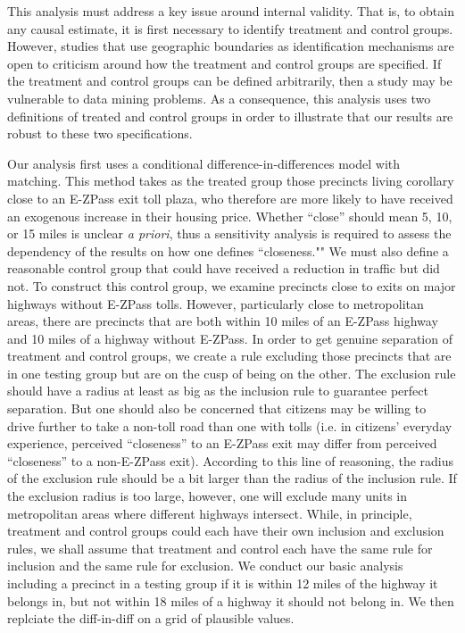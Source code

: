 This analysis must address a key issue around internal validity. That is, to obtain any causal estimate, it is first necessary to identify treatment and control groups. However, studies that use geographic boundaries as identification mechanisms are open to criticism around how the treatment and control groups are specified. If the treatment and control groups can be defined arbitrarily, then a study may be vulnerable to data mining problems. As a consequence, this analysis uses two definitions of treated and control groups in order to illustrate that our results are robust to these two specifications. 

Our analysis first uses a conditional difference-in-differences model with matching. This method takes as the treated group those precincts living corollary close to an E-ZPass exit toll plaza, who therefore are more likely to have received an exogenous increase in their housing price. Whether ``close'' should mean 5, 10, or 15 miles is unclear \emph{a priori}, thus a sensitivity analysis is required to assess the dependency of the results on how one defines ``closeness."" We must also define a reasonable control group that could have received a reduction in traffic but did not. To construct this control group, we examine precincts close to exits on major highways without E-ZPass tolls. However, particularly close to metropolitan areas, there are precincts that are both within 10 miles of an E-ZPass highway and 10 miles of a highway without E-ZPass.  In order to get genuine separation of treatment and control groups, we create a rule excluding those precincts that are in one testing group but are on the cusp of being on the other. The exclusion rule should have a radius at least as big as the inclusion rule to guarantee perfect separation. But one should also be concerned that citizens may be willing to drive further to take a non-toll road than one with tolls (i.e. in citizens' everyday experience, perceived ``closeness'' to an E-ZPass exit may differ from perceived ``closeness'' to a non-E-ZPass exit). According to this line of reasoning, the radius of the exclusion rule should be a bit larger than the radius of the inclusion rule. If the exclusion radius is too large, however, one will exclude many units in metropolitan areas where different highways intersect. While, in principle, treatment and control groups could each have their own inclusion and exclusion rules, we shall assume that treatment and control each have the same rule for inclusion and the same rule for exclusion.  We conduct our basic analysis including a precinct in a testing group if it is within 12 miles of the highway it belongs in, but not within 18 miles of a highway it should not belong in. We then replciate the diff-in-diff on a grid of plausible values.


